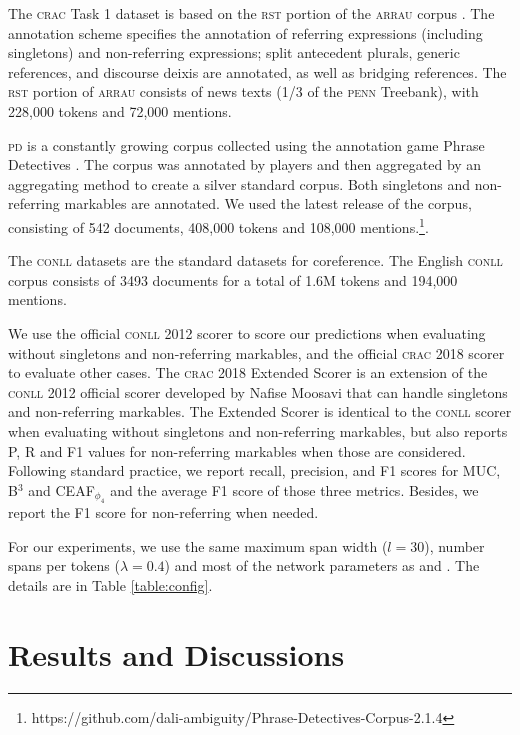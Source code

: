 \documentclass[10pt, a4paper]{article}
\newcommand{\ACRO}[1]{\textsc{#1}}
\newcommand{\ARRAU}{\ACRO{arrau}}
\newcommand{\CONLL}{\ACRO{conll}}
\newcommand{\CRAC}{\ACRO{crac}}
\newcommand{\PD}{\ACRO{pd}}
\newcommand{\pdfull}{Phrase Detectives}
\begin{document}
The {\CRAC} Task 1 dataset is based on the \ACRO{rst} portion of the {\ARRAU} corpus \cite{uryupina-et-al:NLEJ}.
The annotation scheme specifies the annotation of referring expressions (including singletons) and non-referring expressions; split antecedent plurals, generic references, and discourse deixis are annotated, as well as bridging references. The \ACRO{rst} portion of {\ARRAU} consists of news texts (1/3 of the \ACRO{penn} Treebank), 
with 228,000 tokens and 72,000 mentions.

{\PD} is a constantly growing corpus collected using the annotation game {\pdfull} \cite{poesio-etal-2019-crowdsourced}. The corpus was annotated by players and then aggregated by an aggregating method to create a silver standard corpus. 
Both singletons and non-referring markables are annotated. 
We used the latest release of the corpus, consisting  of 542 documents, 408,000 tokens and 108,000 mentions.\footnote{https://github.com/dali-ambiguity/Phrase-Detectives-Corpus-2.1.4}.

The {\CONLL} datasets are the standard datasets 
for coreference. 
The English {\CONLL} corpus consists of 
3493 documents 
for a total of 1.6M tokens and 194,000 mentions. 

We use the official {\CONLL} 2012 scorer to score our predictions when evaluating without singletons and non-referring markables, 
and the official {\CRAC} 2018 scorer \cite{poesio2018crac} to evaluate other cases. 
The {\CRAC} 2018 Extended Scorer is an extension of the {\CONLL} 2012 official scorer developed by Nafise Moosavi that can handle singletons and non-referring markables. 
The Extended Scorer is identical to the {\CONLL} scorer when evaluating without singletons and non-referring markables, but also reports P, R and F1 values for non-referring markables when those are considered. 
Following standard practice, we report recall, precision, and F1 scores for MUC, B$^3$ and CEAF$_{\phi_4}$ and the average F1 score of those three metrics. Besides, we report the F1 score for non-referring when needed.

For our experiments, we use the same maximum span width ($l=30$), number spans per tokens ($\lambda=0.4$) and most of the network parameters as  and . 
The details are in Table \ref{table:config}.



\section{Results and Discussions}
\label{sec:results}
\end{document}
